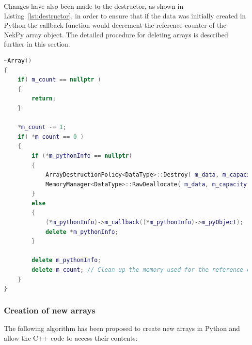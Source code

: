 Changes have also been made to the destructor, as shown in
Listing~\ref{lst:destructor}, in order to ensure that if the data was initially
created in Python the callback function would decrement the reference counter of
the NekPy array object. The detailed procedure for deleting arrays is described
further in this section.

\begin{lstlisting}[caption={The modified destructor for C++ arrays.}, label={lst:destructor}, language=C++]
~Array()
{
    if( m_count == nullptr )
    {
        return;
    }

    *m_count -= 1;
    if( *m_count == 0 )
    {
        if (*m_pythonInfo == nullptr)
        {
            ArrayDestructionPolicy<DataType>::Destroy( m_data, m_capacity );
            MemoryManager<DataType>::RawDeallocate( m_data, m_capacity );
        }
        else
        {
            (*m_pythonInfo)->m_callback((*m_pythonInfo)->m_pyObject);
            delete *m_pythonInfo;
        }

        delete m_pythonInfo;
        delete m_count; // Clean up the memory used for the reference count.
    }
}
\end{lstlisting}

\subsubsection{Creation of new arrays}

The following algorithm has been proposed to create new arrays in Python and
allow the C++ code to access their contents:

